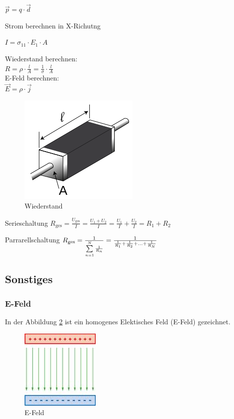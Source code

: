 \documentclass[a4paper, 10pt]{scrartcl}
\begin{document}
$ \vec{p}=q\cdot\vec{d} $


Strom berechnen in X-Richutng

$ I = \sigma_{11} \cdot E_1 \cdot A $


Wiederstand berechnen:\\
$ R=\rho\cdot\frac{l}{A}=\frac{1}{\sigma} \cdot\frac{l}{A}$\\

E-Feld berechnen:\\
$ \vec E = \rho \cdot \vec j $\\


\begin{figure}[h!]
	\begin{center}
		\includegraphics[scale=0.5]{images/Wiederstand.png}
		\caption{Wiederstand}
		\label{fig:Wiederstand}
	\end{center}
\end{figure}

Serieschaltung
$R_\mathrm{ges} = \frac{U_\mathrm{ges}}{I} = \frac{U_1 + U_2}{I} = \frac{U_1}{I} + \frac{U_2}{I} = R_1 + R_2 $


Parrarellschaltung
$
R_\mathrm{ges} = {1 \over {\sum\limits_{n=1}^N {1 \over R_n}}} = {1 \over {{1 \over R_1} + {1 \over R_2} + \ldots + {1 \over R_N}}}$





\subsection{Sonstiges}



\subsubsection{E-Feld}

In der Abbildung \ref{fig:E-Feld} ist ein homogenes Elektisches Feld (E-Feld) gezeichnet.

\begin{figure}[h!]
	\begin{center}
		\includegraphics[scale=0.5]{images/E-Feld.jpg}
		\caption{E-Feld}
		\label{fig:E-Feld}
	\end{center}
\end{figure}
\end{document}
